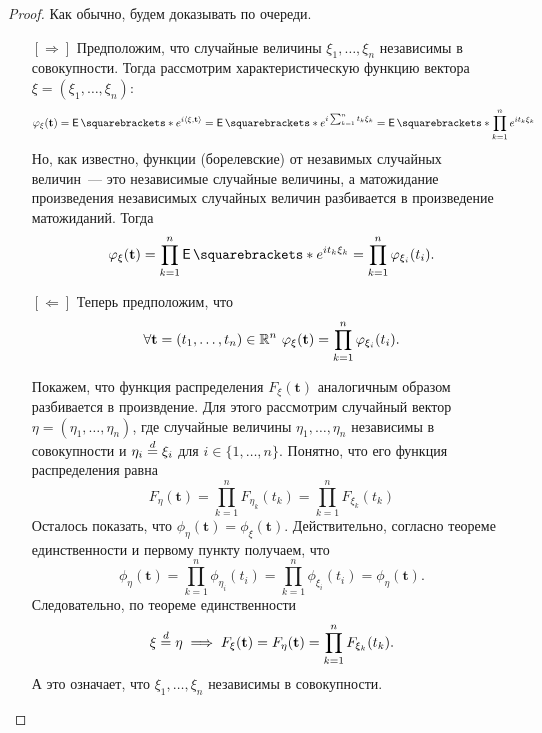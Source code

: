 \begin{proof}
	Как обычно, будем доказывать по очереди.
	\begin{itemize}
		\item[{\([\Rightarrow]\)}] Предположим, что случайные величины \(\xi_{1}, \dots, \xi_{n}\) независимы в совокупности. Тогда рассмотрим характеристическую функцию вектора \(\xi = (\xi_1, \dots, \xi_n)\):
		\[
			\phi_{\xi}(\mathbf{t}) = \E{e^{i\left\langle\xi, \mathbf{t}\right\rangle}} = \E{e^{i\sum_{k = 1}^{n} t_k\xi_k}} = \E{\prod_{k = 1}^{n} e^{it_k\xi_{k}}}
		\]
		Но, как известно, функции (борелевские) от незавимых случайных величин~--- это независимые случайные величины, а матожидание произведения независимых случайных величин разбивается в произведение матожиданий. Тогда
		\[
			\phi_{\xi}(\mathbf{t}) = \prod_{k = 1}^{n} \E{e^{it_k\xi_{k}}} = \prod_{k = 1}^{n} \phi_{\xi_i}(t_i).
		\]
		
		\item[{\([\Leftarrow]\)}] Теперь предположим, что
		\[
			\forall \mathbf{t} = (t_1, \dots, t_n) \in \mathbb{R}^n\ \varphi_{\xi}(\mathbf{t}) = \prod_{k = 1}^{n} \varphi_{\xi_i}(t_i).
		\]
		
		Покажем, что функция распределения \(F_{\xi}(\mathbf{t})\) аналогичным образом разбивается в произвдение. Для этого рассмотрим случайный вектор \(\eta = (\eta_1, \dots, \eta_n)\), где случайные величины \(\eta_1, \dots, \eta_n\) независимы в совокупности и \(\eta_{i} \overset{d}{=} \xi_{i}\) для \(i \in \{1, \dots, n\}\). Понятно, что его функция распределения равна
		\[
			F_{\eta}(\mathbf{t}) = \prod_{k = 1}^{n} F_{\eta_k}(t_k) = \prod_{k = 1}^{n} F_{\xi_k}(t_k)
		\]
		Осталось показать, что \(\phi_{\eta}(\mathbf{t}) = \phi_{\xi}(\mathbf{t})\). Действительно, согласно теореме единственности и первому пункту получаем, что
		\[
			\phi_{\eta}(\mathbf{t}) = \prod_{k = 1}^{n} \phi_{\eta_i}(t_i) = \prod_{k = 1}^{n} \phi_{\xi_i}(t_i) = \phi_{\eta}(\mathbf{t}).
		\]
		Следовательно, по теореме единственности
		\[
			\xi \overset{d}{=} \eta \implies F_{\xi}(\mathbf{t}) = F_{\eta}(\mathbf{t}) = \prod_{k = 1}^{n} F_{\xi_k}(t_k).
		\]
		А это означает, что \(\xi_{1}, \dots, \xi_{n}\) независимы в совокупности.
	\end{itemize}
\end{proof}

